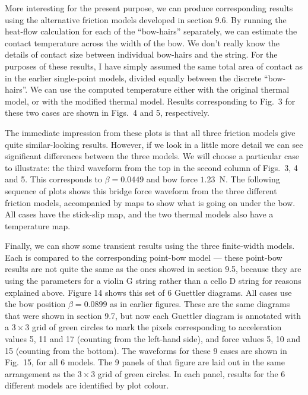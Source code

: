   More interesting for the present purpose, we can produce corresponding 
  results using the alternative friction models developed in section 9.6. By 
  running the heat-flow calculation for each of the ``bow-hairs'' separately, 
  we can estimate the contact temperature across the width of the bow. We don't 
  really know the details of contact size between individual bow-hairs and the 
  string. For the purposes of these results, I have simply assumed the same 
  total area of contact as in the earlier single-point models, divided equally 
  between the discrete ``bow-hairs''. We can use the computed temperature 
  either with the original thermal model, or with the modified thermal model. 
  Results corresponding to Fig.\ 3 for these two cases are shown in Figs.\ 4 
  and 5, respectively. 

  The immediate impression from these plots is that all three friction models 
  give quite similar-looking results. However, if we look in a little more 
  detail we can see significant differences between the three models. We will 
  choose a particular case to illustrate: the third waveform from the top in 
  the second column of Figs.\ 3, 4 and 5. This corresponds to $\beta=0.0449$ 
  and bow force $1.23$~N. The following sequence of plots shows this bridge 
  force waveform from the three different friction models, accompanied by maps 
  to show what is going on under the bow. All cases have the stick-slip map, 
  and the two thermal models also have a temperature map. 

  Finally, we can show some transient results using the three finite-width 
  models. Each is compared to the corresponding point-bow model --- these 
  point-bow results are not quite the same as the ones showed in section 9.5, 
  because they are using the parameters for a violin G string rather than a 
  cello D string for reasons explained above. Figure 14 shows this set of 6 
  Guettler diagrams. All cases use the bow position $\beta = 0.0899$ as in 
  earlier figures. These are the same diagrams that were shown in section 9.7, 
  but now each Guettler diagram is annotated with a $3 \times 3$ grid of green 
  circles to mark the pixels corresponding to acceleration values 5, 11 and 17 
  (counting from the left-hand side), and force values 5, 10 and 15 (counting 
  from the bottom). The waveforms for these 9 cases are shown in Fig.\ 15, for 
  all 6 models. The 9 panels of that figure are laid out in the same 
  arrangement as the $3 \times 3$ grid of green circles. In each panel, results 
  for the 6 different models are identified by plot colour. 

